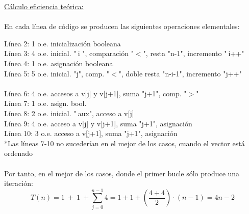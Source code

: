 \documentclass[titlepage, 12pt,a4paper]{article}
\begin{document}
\underline{Cálculo eficiencia teórica:}
\\\\
En cada línea de código se producen las siguientes operaciones elementales:

Línea 2: 1 o.e. inicialización booleana\\
Línea 3: 4 o.e. inicial. "$\ $i ", comparación "$<$", resta "n-1", incremento "$\ $i++"\\
Línea 4: 1 o.e. asignación booleana\\
Línea 5: 5 o.e. inicial. "j", comp. "$<$", doble resta "n-i-1", incremento "j++"\\\\
Línea 6: 4 o.e. accesos a v[j] y v[j+1], suma "j+1", comp. "$>$"\\
Línea 7: 1 o.e. asign. bool.\\
Línea 8: 2 o.e. inicial. "$\ $aux", acceso a v[j]\\
Línea 9: 4 o.e. acceso a v[j] y v[j+1], suma "j+1", asignación\\
Línea 10: 3 o.e. acceso a v[j+1], suma "j+1", asignación\\

*Las líneas 7-10 no sucederían en el mejor de los casos, cuando el vector está ordenado
\ 
\\\\ 
Por tanto, en el mejor de los casos, donde el primer bucle sólo produce una iteración:\\ 
$$T(n)=1\ +\ 1\ +\sum \limits_{j=0}^{n-1} 4= 1+1+(\frac{4+4}{2})\cdot(n-1)= 4n-2 $$
 
\vspace {1em}  	
\end{document}

